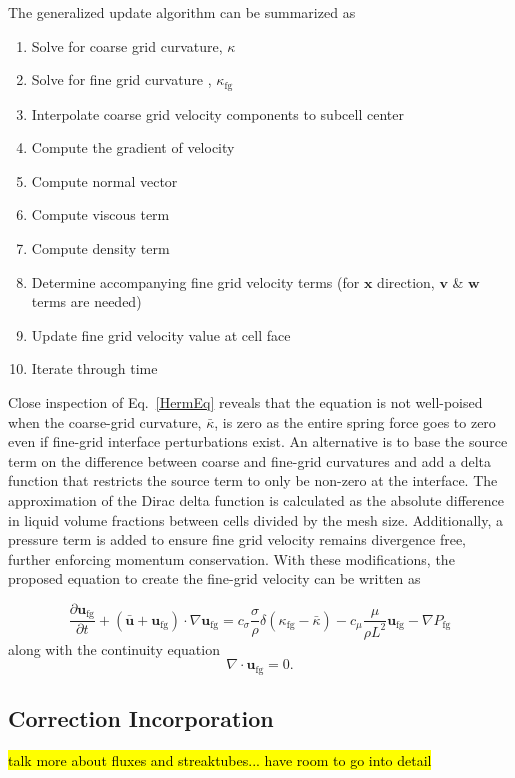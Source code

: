 The generalized update algorithm can be summarized as 
\begin{enumerate}
	\item Solve for coarse grid curvature, $\kappa$
	\item Solve for fine grid curvature , $\kappa_{\text{fg}}$
	\item Interpolate coarse grid velocity components to subcell center
	\item Compute the gradient of velocity
	\item Compute normal vector 
	\item Compute viscous term 
	\item Compute density term
	\item Determine accompanying fine grid velocity terms (for $\bm{x}$ direction, $\bm{v}$ \& $\bm{w}$ terms are needed) 
	\item Update fine grid velocity value at cell face
	\item Iterate through time
\end{enumerate}

Close inspection of Eq.~\ref{HermEq} reveals that the equation is not well-poised when the coarse-grid curvature, $\bar{\kappa}$, is zero as the entire spring force goes to zero even if fine-grid interface perturbations exist.  An alternative is to base the source term on the difference between coarse and fine-grid curvatures and add a delta function that restricts the source term to only be non-zero at the interface.  The approximation of the Dirac delta function is calculated as the absolute difference in liquid volume fractions between cells divided by the mesh size. Additionally, a pressure term is added to ensure fine grid velocity remains divergence free, further enforcing momentum conservation. With these modifications, the proposed equation to create the fine-grid velocity can be written as

\begin{equation}
\frac{\partial \bm{u}_{\text{fg}}}{\partial t} +
(\bar{\bm{u}}+\bm{u}_{\text{fg}}) \cdot \nabla \bm{u}_{\text{fg}} = 
c_{\sigma}\frac{\sigma}{\rho}\delta(\kappa_{\text{fg}}-\bar{\kappa})- 
c_{\mu}\frac{\mu}{\rho L^2}\bm{u}_{\text{fg}} -
\nabla P_{\text{fg}}\nonumber
\label{MyEq}
\end{equation}
along with the continuity equation
\begin{equation}
\nabla\cdot\bm{u}_\text{fg}=0.
\end{equation}

\subsection*{Correction Incorporation} 
\hl{talk more about fluxes and streaktubes... have room to go into detail}

